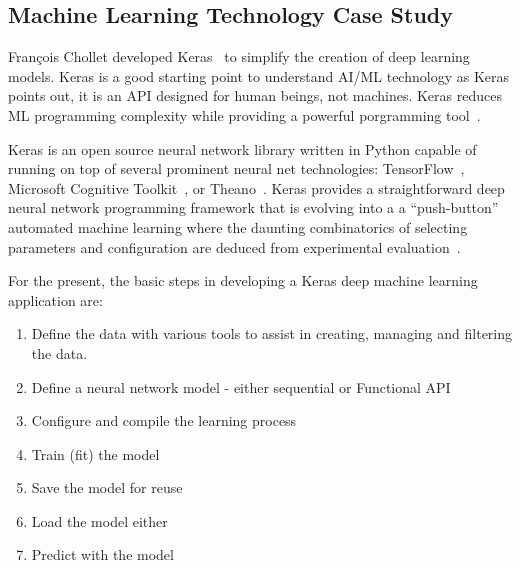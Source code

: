 
\subsection{Machine Learning Technology Case Study}
Fran{\c{c}}ois Chollet developed Keras~\cite{chollet2018keras} to simplify the creation of deep learning models. Keras is a good starting point to understand AI/ML technology as Keras points out, it is an API designed for human beings, not machines. Keras reduces ML programming complexity while providing a powerful porgramming tool~\cite{KerasBenefits}. 

Keras is an open source neural network library written in Python capable of running on top of several prominent neural net technologies: TensorFlow~\cite{abadi2016tensorflow}, Microsoft Cognitive Toolkit~\cite{CNTK}, or Theano~\cite{Theano}. Keras provides a straightforward deep neural network programming framework that is evolving into  a  a ``push-button'' automated machine learning where the daunting combinatorics of selecting parameters and configuration are deduced from experimental evaluation~\cite{jin2018efficient}.

For the present, the basic steps in developing a Keras deep machine learning application are:

\begin{enumerate}
\item Define the data with various tools to assist in creating, managing and filtering the data.
\item Define a neural network model - either sequential or Functional API
\item Configure and compile the learning process
\item Train (fit) the model
\item Save the model for reuse
\item Load the model either
\item Predict with the model

\end{enumerate}

